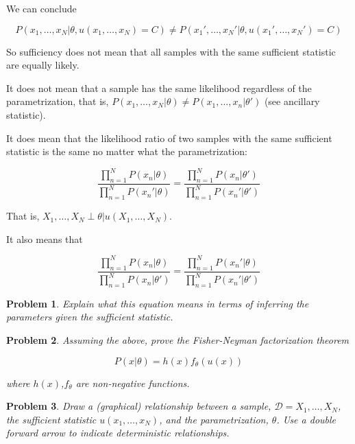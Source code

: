 \documentclass[a4paper]{article}
\newtheorem{problem}{Problem}[section]
\begin{document}
We can conclude

\begin{equation}
  P( x_1, \ldots, x_N \vert \theta, u(x_1,\ldots,x_N) = C ) \neq P( x_1', \ldots, x_N' \vert \theta, u(x_1',\ldots,x_N') = C )
  \label{}
\end{equation}

So sufficiency does not mean that all samples with the same sufficient statistic are equally likely.

It does not mean that a sample has the same likelihood regardless of the parametrization, that is, $ P(x_1,\ldots,x_N \vert \theta) \neq P(x_1,\ldots,x_n \vert \theta')$ (see ancillary statistic).

It does mean that the likelihood ratio of two samples with the same sufficient statistic is the same no matter what the parametrization:

\begin{equation}
  \frac{\prod_{n=1}^N P(x_n \vert \theta) }{ \prod_{n=1}^N P( x_n' \vert \theta) } = \frac{\prod_{n=1}^N P( x_n \vert \theta') }{ \prod_{n=1}^N P( x_n' \vert \theta') }
  \label{}
\end{equation}

That is, $X_1, \ldots, X_N \perp \theta \vert u(X_1, \ldots, X_N) $.

It also means that 

\begin{equation}
  \frac{\prod_{n=1}^N P(x_n \vert \theta) }{ \prod_{n=1}^N P( x_n \vert \theta') } = \frac{\prod_{n=1}^N P( x_n' \vert \theta) }{ \prod_{n=1}^N P( x_n' \vert \theta') }
  \label{}
\end{equation}

\begin{problem}
Explain what this equation means in terms of inferring the parameters given the sufficient statistic.
\end{problem}

\begin{problem}
Assuming the above, prove the Fisher-Neyman factorization theorem

\begin{equation}
  P(x \vert \theta) = h(x) f_\theta( u(x) )
  \label{Fisher-Neyman factorization theorem}
\end{equation}

where $h(x)$,$f_\theta$ are non-negative functions.
\end{problem}

\begin{problem}
Draw a (graphical) relationship between a sample, $\mathcal{D} = X_1,\ldots,X_N$, the sufficient statistic $u(x_1, \ldots, x_N)$, and the parametrization, $\theta$. 
Use a double forward arrow to indicate deterministic relationships.
\end{problem}
\end{document}
